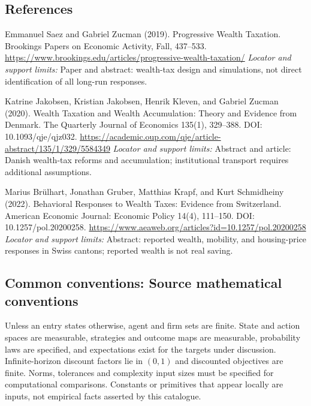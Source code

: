 \documentclass[11pt,a4paper]{article}
\begin{document}
\subsection*{References}
\begin{enumerate}[label={[S\arabic*]},leftmargin=*,itemsep=0.6em]
\item Emmanuel Saez and Gabriel Zucman (2019). Progressive Wealth Taxation. Brookings Papers on Economic Activity, Fall, 437--533.
\url{https://www.brookings.edu/articles/progressive-wealth-taxation/}
\newline\emph{Locator and support limits:} Paper and abstract: wealth-tax design and simulations, not direct identification of all long-run responses.
\item Katrine Jakobsen, Kristian Jakobsen, Henrik Kleven, and Gabriel Zucman (2020). Wealth Taxation and Wealth Accumulation: Theory and Evidence from Denmark. The Quarterly Journal of Economics 135(1), 329--388. DOI: 10.1093/qje/qjz032.
\url{https://academic.oup.com/qje/article-abstract/135/1/329/5584349}
\newline\emph{Locator and support limits:} Abstract and article: Danish wealth-tax reforms and accumulation; institutional transport requires additional assumptions.
\item Marius Brülhart, Jonathan Gruber, Matthias Krapf, and Kurt Schmidheiny (2022). Behavioral Responses to Wealth Taxes: Evidence from Switzerland. American Economic Journal: Economic Policy 14(4), 111--150. DOI: 10.1257/pol.20200258.
\url{https://www.aeaweb.org/articles?id=10.1257/pol.20200258}
\newline\emph{Locator and support limits:} Abstract: reported wealth, mobility, and housing-price responses in Swiss cantons; reported wealth is not real saving.
\end{enumerate}

\subsection*{Common conventions: Source mathematical conventions}

Unless an entry states otherwise, agent and firm sets are finite. State and action spaces are measurable, strategies and outcome maps are measurable, probability laws are specified, and expectations exist for the targets under discussion. Infinite-horizon discount factors lie in $(0,1)$ and discounted objectives are finite. Norms, tolerances and complexity input sizes must be specified for computational comparisons. Constants or primitives that appear locally are inputs, not empirical facts asserted by this catalogue.
\end{document}
